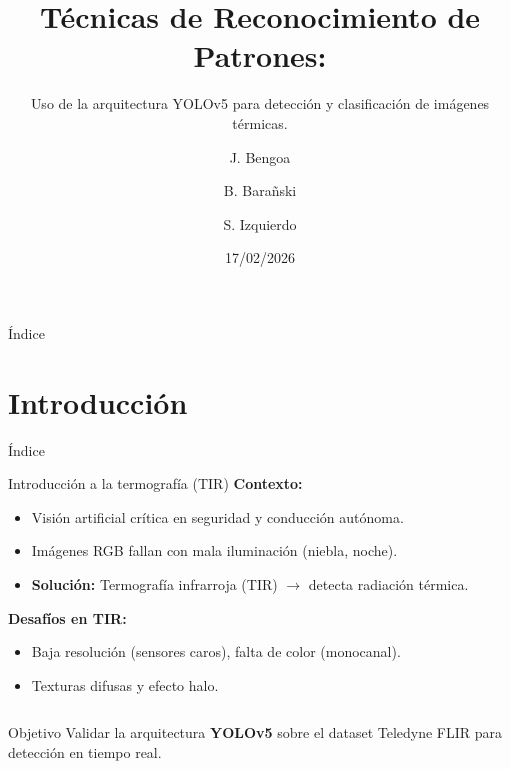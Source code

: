 \documentclass[aspectratio=169]{beamer}
\title[Reconocimiento de Patrones]{Técnicas de Reconocimiento de Patrones: }
\subtitle{Uso de la arquitectura YOLOv5 para detección y clasificación de imágenes térmicas.}
\author{J. Bengoa \and B. Barañski \and S. Izquierdo }
\date{17/02/2026}
\begin{document}
	
	\shorthandoff{<}
	\shorthandoff{>}
	
	\begin{frame}
		\titlepage
	\end{frame}
	
	\begin{frame}{Índice}
		\tableofcontents
	\end{frame}
	
	\section{Introducción}
	\begin{frame}{Índice}
		\tableofcontents[currentsection] 
	\end{frame}
	\begin{frame}{Introducción a la termografía (TIR)}
		\textbf{Contexto:}
		\begin{itemize}
			\item Visión artificial crítica en seguridad y conducción autónoma.
			\item Imágenes RGB fallan con mala iluminación (niebla, noche).
			\item \textbf{Solución:} Termografía infrarroja (TIR) $\rightarrow$ detecta radiación térmica.
		\end{itemize}
		
		\vspace{0.2cm} %
		
		\textbf{Desafíos en TIR:}
		\begin{itemize}
			\item Baja resolución (sensores caros), falta de color (monocanal).
			\item Texturas difusas y efecto halo.
		\end{itemize}
		
		\vfill %
		
		\begin{columns}
			\begin{block}{Objetivo}
				Validar la arquitectura \textbf{YOLOv5} sobre el dataset Teledyne FLIR para detección en tiempo real.
			\end{block}
		\end{columns}
	\end{frame}
	
\end{document}
